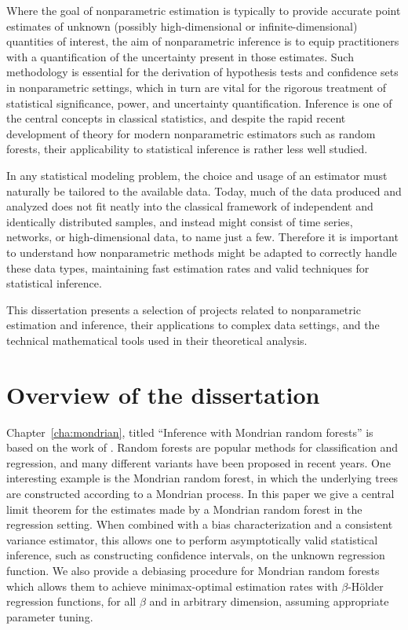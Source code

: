 Where the goal of nonparametric estimation is typically to provide accurate
point estimates of unknown (possibly high-dimensional or infinite-dimensional)
quantities of interest, the aim of nonparametric inference is to equip
practitioners with a quantification of the uncertainty
present in those estimates. Such methodology is essential for the derivation
of hypothesis tests and confidence sets in nonparametric settings,
which in turn are vital for the rigorous treatment of statistical significance,
power, and uncertainty quantification.
Inference is one of the central concepts
in classical statistics, and despite the rapid recent development of
theory for modern nonparametric estimators such as random forests, their
applicability to statistical inference is rather less well studied.

In any statistical modeling problem, the choice and usage of an estimator
must naturally be tailored to the available data.
Today, much of the data produced and analyzed does not fit neatly into the
classical framework of independent and identically distributed samples,
and instead might consist of time series, networks, or
high-dimensional data, to name just a few.
Therefore it is important to understand how
nonparametric methods might be adapted to correctly handle
these data types, maintaining fast estimation
rates and valid techniques for statistical inference.

This dissertation presents a selection of projects related to nonparametric
estimation and inference, their applications to complex data settings,
and the technical mathematical tools used in their theoretical analysis.

\section*{Overview of the dissertation}

Chapter~\ref{cha:mondrian}, titled
``Inference with Mondrian random forests''
is based on the work of \cite{cattaneo2023inference}.
Random forests are popular methods for classification and regression,
and many different variants have been proposed in recent years.
One interesting example is the Mondrian random forest,
in which the underlying trees are constructed according to a Mondrian process.
In this paper we give a central limit theorem
for the estimates made by a Mondrian random forest
in the regression setting.
When combined with a bias characterization and a
consistent variance estimator,
this allows one to perform asymptotically valid statistical inference,
such as constructing confidence intervals,
on the unknown regression function.
We also provide a debiasing procedure for Mondrian random
forests which allows them to achieve minimax-optimal estimation rates
with $\beta$-H{\"o}lder regression functions, for all $\beta$
and in arbitrary dimension, assuming appropriate parameter tuning.

